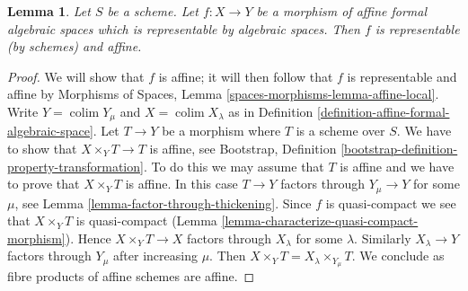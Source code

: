 \documentclass{stacks-project}
\theoremstyle{plain}
\newtheorem{lemma}[subsection]{Lemma}
\theoremstyle{definition}
\theoremstyle{remark}
\numberwithin{equation}{subsection}
\def\colim{\mathop{\mathrm{colim}}\nolimits}
\begin{document}
\begin{lemma}
\label{lemma-affine-representable-by-algebraic-spaces}
Let $S$ be a scheme. Let $f : X \to Y$ be a morphism of
affine formal algebraic spaces which is representable by
algebraic spaces. Then $f$ is representable (by schemes) and affine.
\end{lemma}

\begin{proof}
We will show that $f$ is affine; it will then follow that
$f$ is representable and affine by
Morphisms of Spaces, Lemma \ref{spaces-morphisms-lemma-affine-local}.
Write $Y = \colim Y_\mu$ and $X = \colim X_\lambda$ as in
Definition \ref{definition-affine-formal-algebraic-space}.
Let $T \to Y$ be a morphism where $T$ is a scheme
over $S$. We have to show that $X \times_Y T \to T$ is affine, see
Bootstrap, Definition
\ref{bootstrap-definition-property-transformation}.
To do this we may assume that $T$ is affine and we have to prove
that $X \times_Y T$ is affine. In this case $T \to Y$ factors
through $Y_\mu \to Y$ for some $\mu$, see
Lemma \ref{lemma-factor-through-thickening}.
Since $f$ is quasi-compact we see that $X \times_Y T$ is
quasi-compact (Lemma \ref{lemma-characterize-quasi-compact-morphism}).
Hence $X \times_Y T \to X$ factors through $X_\lambda$ for some
$\lambda$. Similarly $X_\lambda \to Y$ factors through $Y_\mu$
after increasing $\mu$. Then
$X \times_Y T = X_\lambda \times_{Y_\mu} T$.
We conclude as fibre products of affine schemes are affine.
\end{proof}
\end{document}
